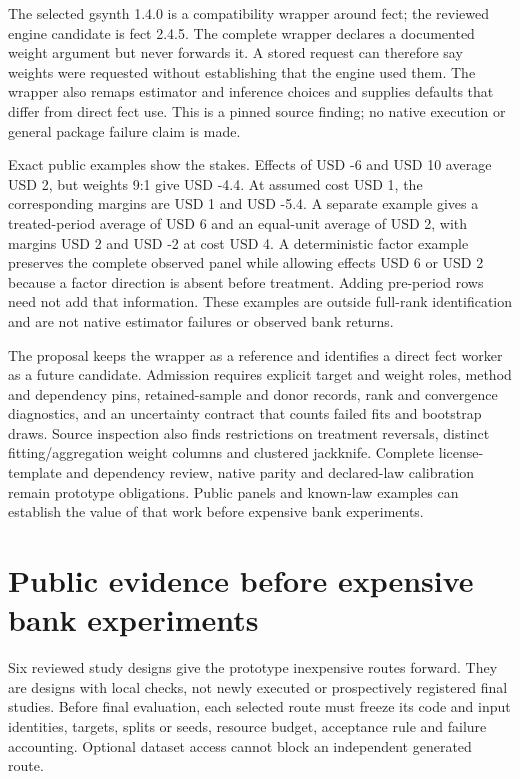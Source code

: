 The selected gsynth 1.4.0 is a compatibility wrapper around fect; the
reviewed engine candidate is fect 2.4.5. The complete wrapper declares a
documented weight argument but never forwards it. A stored request can
therefore say weights were requested without establishing that the
engine used them. The wrapper also remaps estimator and inference
choices and supplies defaults that differ from direct fect use. This is
a pinned source finding; no native execution or general package failure
claim is made. \cite{exec21_gsynth_wrapper,exec21_gsynth_engine}

Exact public examples show the stakes. Effects of USD -6 and USD 10
average USD 2, but weights 9:1 give USD -4.4. At assumed cost USD 1, the
corresponding margins are USD 1 and USD -5.4. A separate example gives a
treated-period average of USD 6 and an equal-unit average of USD 2, with
margins USD 2 and USD -2 at cost USD 4. A deterministic factor example
preserves the complete observed panel while allowing effects USD 6 or
USD 2 because a factor direction is absent before treatment. Adding
pre-period rows need not add that information. These examples are
outside full-rank identification and are not native estimator failures
or observed bank returns. \cite{exec21_gsynth_reference}

The proposal keeps the wrapper as a reference and identifies a direct
fect worker as a future candidate. Admission requires explicit target
and weight roles, method and dependency pins, retained-sample and donor
records, rank and convergence diagnostics, and an uncertainty contract
that counts failed fits and bootstrap draws. Source inspection also
finds restrictions on treatment reversals, distinct fitting/aggregation
weight columns and clustered jackknife. Complete license-template and
dependency review, native parity and declared-law calibration remain
prototype obligations. Public panels and known-law examples can
establish the value of that work before expensive bank experiments.

\hypertarget{public-evidence-before-expensive-bank-experiments}{%
\section{Public evidence before expensive bank
experiments}\label{public-evidence-before-expensive-bank-experiments}}

Six reviewed study designs give the prototype inexpensive routes
forward. They are designs with local checks, not newly executed or
prospectively registered final studies. Before final evaluation, each
selected route must freeze its code and input identities, targets,
splits or seeds, resource budget, acceptance rule and failure
accounting. Optional dataset access cannot block an independent
generated route. \citep{sp13_public}

